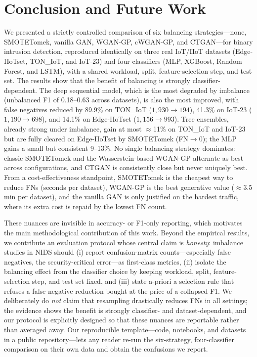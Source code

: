 ﻿\documentclass[journal]{IEEEtran}
\begin{document}
\section{Conclusion and Future Work}
\label{sec:conclusion}
We presented a strictly controlled comparison of six balancing strategies---none, SMOTETomek, vanilla GAN, WGAN-GP, cWGAN-GP, and CTGAN---for binary intrusion detection, reproduced identically on three real IoT/IIoT datasets (Edge-IIoTset, TON\_IoT, and IoT-23) and four classifiers (MLP, XGBoost, Random Forest, and LSTM), with a shared workload, split, feature-selection step, and test set. The results show that the benefit of balancing is strongly classifier-dependent. The deep sequential model, which is the most degraded by imbalance (unbalanced F1 of 0.18--0.63 across datasets), is also the most improved, with false negatives reduced by 89.9\% on TON\_IoT ($1{,}930\rightarrow194$), 41.3\% on IoT-23 ($1{,}190\rightarrow698$), and 14.1\% on Edge-IIoTset ($1{,}156\rightarrow993$). Tree ensembles, already strong under imbalance, gain at most $\approx$11\% on TON\_IoT and IoT-23 but are fully cleared on Edge-IIoTset by SMOTETomek (FN$\rightarrow$0); the MLP gains a small but consistent 9--13\%. No single balancing strategy dominates: classic SMOTETomek and the Wasserstein-based WGAN-GP alternate as best across configurations, and CTGAN is consistently close but never uniquely best. From a cost-effectiveness standpoint, SMOTETomek is the cheapest way to reduce FNs (seconds per dataset), WGAN-GP is the best generative value ($\approx$3.5 min per dataset), and the vanilla GAN is only justified on the hardest traffic, where its extra cost is repaid by the lowest FN count.

These nuances are invisible in accuracy- or F1-only reporting, which motivates the main methodological contribution of this work. Beyond the empirical results, we contribute an evaluation protocol whose central claim is \emph{honesty}: imbalance studies in NIDS should (i) report confusion-matrix counts---especially false negatives, the security-critical error---as first-class metrics, (ii) isolate the balancing effect from the classifier choice by keeping workload, split, feature-selection step, and test set fixed, and (iii) state a-priori a selection rule that refuses a false-negative reduction bought at the price of a collapsed F1. We deliberately do \emph{not} claim that resampling drastically reduces FNs in all settings; the evidence shows the benefit is strongly classifier- and dataset-dependent, and our protocol is explicitly designed so that these nuances are reportable rather than averaged away. Our reproducible template---code, notebooks, and datasets in a public repository---lets any reader re-run the six-strategy, four-classifier comparison on their own data and obtain the confusions we report.
\end{document}
